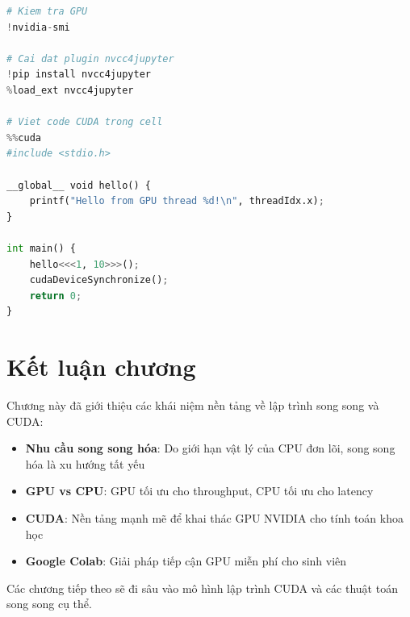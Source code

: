 \begin{lstlisting}[language=Python, caption={Cài đặt và sử dụng CUDA trên Google Colab}]
# Kiem tra GPU
!nvidia-smi

# Cai dat plugin nvcc4jupyter
!pip install nvcc4jupyter
%load_ext nvcc4jupyter

# Viet code CUDA trong cell
%%cuda
#include <stdio.h>

__global__ void hello() {
    printf("Hello from GPU thread %d!\n", threadIdx.x);
}

int main() {
    hello<<<1, 10>>>();
    cudaDeviceSynchronize();
    return 0;
}
\end{lstlisting}

\section{Kết luận chương}

Chương này đã giới thiệu các khái niệm nền tảng về lập trình song song và CUDA:

\begin{itemize}
    \item \textbf{Nhu cầu song song hóa}: Do giới hạn vật lý của CPU đơn lõi, song song hóa là xu hướng tất yếu
    \item \textbf{GPU vs CPU}: GPU tối ưu cho throughput, CPU tối ưu cho latency
    \item \textbf{CUDA}: Nền tảng mạnh mẽ để khai thác GPU NVIDIA cho tính toán khoa học
    \item \textbf{Google Colab}: Giải pháp tiếp cận GPU miễn phí cho sinh viên
\end{itemize}

Các chương tiếp theo sẽ đi sâu vào mô hình lập trình CUDA và các thuật toán song song cụ thể.
